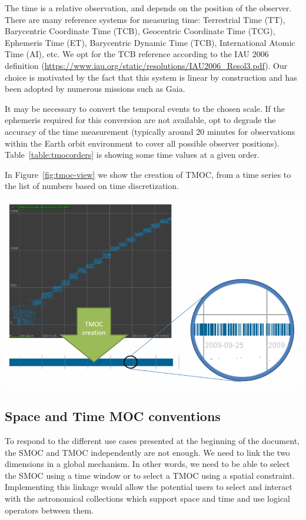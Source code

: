 \documentclass[11pt,a4paper]{ivoa}
\begin{document}
The time is a relative observation, and depends on the position of the
observer. There are many reference systems for measuring time:
Terrestrial Time (TT), Barycentric Coordinate Time (TCB), Geocentric
Coordinate Time (TCG), Ephemeris Time (ET), Barycentric Dynamic Time
(TCB), International Atomic Time (AI), etc. We opt for the TCB
reference according to the IAU 2006 definition
(\url{https://www.iau.org/static/resolutions/IAU2006_Resol3.pdf}). Our
choice is motivated by the fact that this system is linear by
construction and has been adopted by numerous missions such as Gaia.

It may be necessary to convert the temporal events to the
chosen scale. If the ephemeris required for this conversion are
not available, opt to degrade the accuracy of the time measurement
(typically around 20 minutes for observations within the Earth orbit
environment to cover all possible observer positions).
Table~\ref{table:tmocorders} is showing some time values at a given order.

In Figure~\ref{fig:tmoc-view} we show the creation of TMOC, from a time
series to the list of numbers based on time discretization.
      
\begin{adjustbox}{center,caption={TMOC: from the
      time series to the list of numbers based on time
      discretization},label={fig:tmoc-view},nofloat=figure,vspace=\bigskipamount}
\includegraphics[width=\textwidth]{tmoc_view.png}
\end{adjustbox} 

\subsection{Space and Time MOC conventions}
To respond to the different use cases presented at the beginning of
the document, the SMOC and TMOC independently are not enough. We need
to link the two dimensions in a global mechanism. In other words, we
need to be able to select the SMOC using a time window or to select a
TMOC using a spatial constraint. Implementing this linkage would allow
the potential users to select and interact with the astronomical
collections which support space and time and use logical
operators between them.
\end{document}
